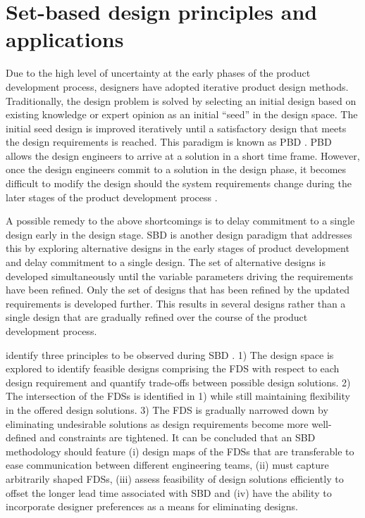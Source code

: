 \section{Set-based design principles and applications} 
\label{sec:SBD}

Due to the high level of uncertainty at the early phases of the product development process, designers have adopted iterative product design methods. Traditionally, the design problem is solved by selecting an initial design based on existing knowledge or expert opinion as an initial ``seed'' in the design space. The initial seed design is improved iteratively until a satisfactory design that meets the design requirements is reached. This paradigm is known as \ac{PBD} \cite{Qureshi2014, Kerga2014, SobekIi1999}. \ac{PBD} allows the design engineers to arrive at a solution in a short time frame. However, once the design engineers commit to a solution in the design phase, it becomes difficult to modify the design should the system requirements change during the later stages of the product development process \cite{Levandowski2014a, Carlson2000a}.

A possible remedy to the above shortcomings is to delay commitment to a single design early in the design stage. \acf{SBD} is another design paradigm that addresses this by exploring alternative designs in the early stages of product development and delay commitment to a single design. The set of alternative designs is developed simultaneously until the variable parameters driving the requirements have been refined. Only the set of designs that has been refined by the updated requirements is developed further. This results in several designs rather than a single design that are gradually refined over the course of the product development process.

\citeauthor{SobekIi1999} identify three principles to be observed during \ac{SBD} \cite{SobekIi1999}. 1) The design space is explored to identify feasible designs comprising the \ac{FDS} with respect to each design requirement and quantify trade-offs between possible design solutions. 2) The intersection of the \acp{FDS} is identified in 1) while still maintaining flexibility in the offered design solutions. 3) The \ac{FDS} is gradually narrowed down by eliminating undesirable solutions as design requirements become more well-defined and constraints are tightened. It can be concluded that an \ac{SBD} methodology should feature (i) design maps of the \acp{FDS} that are transferable to ease communication between different engineering teams, (ii) must capture arbitrarily shaped \acp{FDS}, (iii) assess feasibility of design solutions efficiently to offset the longer lead time associated with \ac{SBD} and (iv) have the ability to incorporate designer preferences as a means for eliminating designs.

